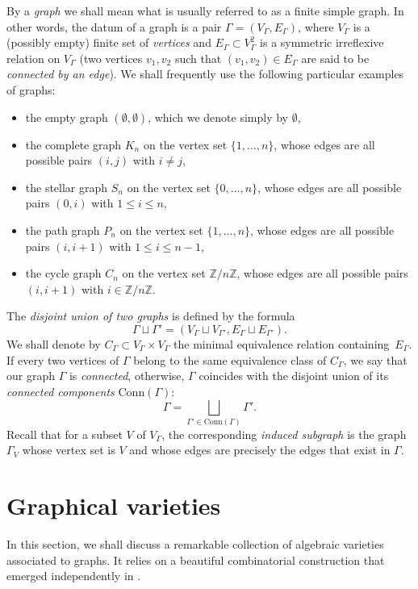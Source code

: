 By a \emph{graph} we shall mean what is usually referred to as a finite simple graph. In other words, the datum of a graph is a pair $\Gamma=(V_\Gamma,E_\Gamma)$, where $V_\Gamma$ is a (possibly empty) finite set of \emph{vertices} and $E_\Gamma\subset V_\Gamma^2$ is a symmetric irreflexive relation on $V_\Gamma$ (two vertices $v_1,v_2$ such that $(v_1,v_2)\in E_\Gamma$ are said to be \emph{connected by an edge}). We shall frequently use the following particular examples of graphs:
\begin{itemize}
\item the empty graph $(\emptyset,\emptyset)$, which we denote simply by $\emptyset$,
\item the complete graph $K_n$ on the vertex set $\{1,\ldots,n\}$, whose edges are all possible pairs $(i,j)$ with $i\ne j$,
\item the stellar graph $S_n$ on the vertex set $\{0,\ldots,n\}$, whose edges are all possible pairs $(0,i)$ with $1\le i\le n$,
\item the path graph $P_n$ on the vertex set $\{1,\ldots,n\}$, whose edges are all possible pairs $(i,i+1)$ with $1\le i\le n-1$, 
\item the cycle graph $C_n$ on the vertex set $\mathbb{Z}/n\mathbb{Z}$, whose edges are all possible pairs $(i,i+1)$ with $i\in\mathbb{Z}/n\mathbb{Z}$. 
\end{itemize}

The \emph{disjoint union of two graphs} is defined by the formula 
 \[
\Gamma\sqcup \Gamma' = (V_\Gamma\sqcup V_{\Gamma'}, E_\Gamma\sqcup E_{\Gamma'}). 
 \]
We shall denote by $C_\Gamma\subset V_\Gamma\times V_\Gamma$ the minimal equivalence relation containing~$E_\Gamma$. If every two vertices of $\Gamma$ belong to the same equivalence class of $C_\Gamma$, we say that our graph $\Gamma$ is \emph{connected}, otherwise, $\Gamma$ coincides with the disjoint union of its \emph{connected components} $\mathrm{Conn}(\Gamma)$:
 \[
\Gamma=\bigsqcup_{\Gamma'\in\mathrm{Conn}(\Gamma)}\Gamma'. 
 \]
Recall that for a subset $V$ of $V_\Gamma$, the corresponding \emph{induced subgraph} is the graph $\Gamma_V$ whose vertex set is $V$ and whose edges are precisely the edges that exist in $\Gamma$. 

\section{Graphical varieties}\label{sec:graphical-vars}

In this section, we shall discuss a remarkable collection of algebraic varieties associated to graphs. It relies on a beautiful combinatorial construction that emerged independently in \cite{MR2239078,MR2487491,MR2470574,MR2252112}. 

